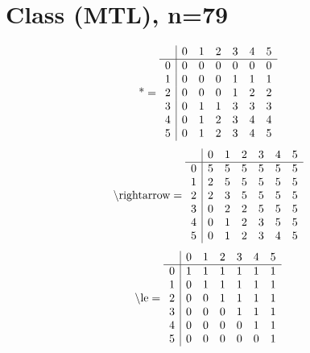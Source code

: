 \documentclass[11pt]{article}
\begin{document}
\section{Class (MTL), n=79}
\[\text{*} = 
\begin{array}{r | r r r r r r}
 & 0 & 1 & 2 & 3 & 4 & 5 \\ \hline
0 & 0 & 0 & 0 & 0 & 0 & 0 \\
1 & 0 & 0 & 0 & 1 & 1 & 1 \\
2 & 0 & 0 & 0 & 1 & 2 & 2 \\
3 & 0 & 1 & 1 & 3 & 3 & 3 \\
4 & 0 & 1 & 2 & 3 & 4 & 4 \\
5 & 0 & 1 & 2 & 3 & 4 & 5 \\
\end{array}
\]
\[\text{\textbackslash rightarrow} = 
\begin{array}{r | r r r r r r}
 & 0 & 1 & 2 & 3 & 4 & 5 \\ \hline
0 & 5 & 5 & 5 & 5 & 5 & 5 \\
1 & 2 & 5 & 5 & 5 & 5 & 5 \\
2 & 2 & 3 & 5 & 5 & 5 & 5 \\
3 & 0 & 2 & 2 & 5 & 5 & 5 \\
4 & 0 & 1 & 2 & 3 & 5 & 5 \\
5 & 0 & 1 & 2 & 3 & 4 & 5 \\
\end{array}
\]
\[\text{\textbackslash le} = 
\begin{array}{r | r r r r r r}
 & 0 & 1 & 2 & 3 & 4 & 5 \\ \hline
0 & 1 & 1 & 1 & 1 & 1 & 1 \\
1 & 0 & 1 & 1 & 1 & 1 & 1 \\
2 & 0 & 0 & 1 & 1 & 1 & 1 \\
3 & 0 & 0 & 0 & 1 & 1 & 1 \\
4 & 0 & 0 & 0 & 0 & 1 & 1 \\
5 & 0 & 0 & 0 & 0 & 0 & 1 \\
\end{array}
\]
\end{document}
